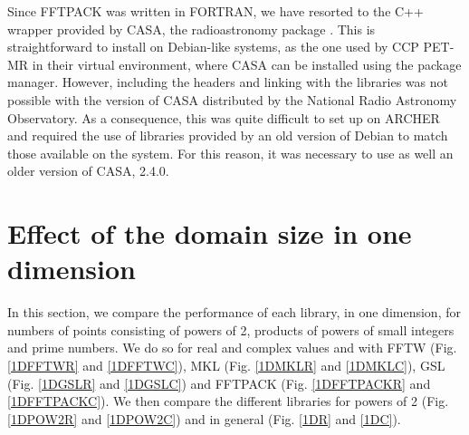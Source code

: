 \documentclass[12pt, a4paper]{article}
\begin{document}
Since FFTPACK was written in FORTRAN, we have resorted to the C++ wrapper provided by CASA, the radioastronomy package \cite{casa}. This is straightforward to install on Debian-like systems, as the one used by CCP PET-MR in their virtual environment, where CASA can be installed using the package manager. However, including the headers and linking with the libraries was not possible with the version of CASA distributed by the National Radio Astronomy Observatory. As a consequence, this was quite difficult to set up on ARCHER and required the use of libraries provided by an old version of Debian to match those available on the system. For this reason, it was necessary to use as well an older version of CASA, 2.4.0.

\pagebreak
\section{Effect of the domain size in one dimension}\label{PERFORMANCE1D}

In this section, we compare the performance of each library, in one dimension, for numbers of points consisting of powers of 2, products of powers of small integers and prime numbers. We do so for real and complex values and with FFTW (Fig. \ref{1DFFTWR} and \ref{1DFFTWC}), MKL (Fig. \ref{1DMKLR} and \ref{1DMKLC}), GSL (Fig. \ref{1DGSLR} and \ref{1DGSLC}) and FFTPACK (Fig. \ref{1DFFTPACKR} and \ref{1DFFTPACKC}). We then compare the different libraries for powers of 2 (Fig. \ref{1DPOW2R} and \ref{1DPOW2C}) and in general (Fig. \ref{1DR} and \ref{1DC}).\\
\end{document}
